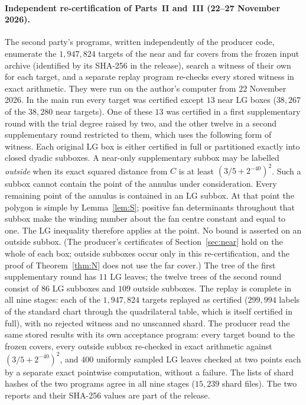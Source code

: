 \documentclass[11pt]{article}
\theoremstyle{remark}
\begin{document}
\paragraph{Independent re-certification of Parts~II and~III (22--27 November 2026).} The second party's programs,
written independently of the producer code, enumerate the $1{,}947{,}824$ targets of the near and far covers from the
frozen input archive (identified by its SHA-256 in the release), search a witness of their own for each target, and a
separate replay program re-checks every stored witness in exact arithmetic. They were run on the author's computer from
22 November 2026. In the main run every target was certified except $13$ near LG boxes ($38{,}267$ of the $38{,}280$
near targets). One of these $13$ was certified in a first supplementary round with the trial degree raised by two, and
the other twelve in a second supplementary round restricted to them, which uses the following form of witness. Each
original LG box is either certified in full or partitioned exactly into closed dyadic subboxes. A near-only
supplementary subbox may be labelled \emph{outside} when its exact squared distance from $C$ is at least
$(3/5+2^{-40})^2$. Such a subbox cannot contain the point of the annulus under consideration. Every remaining point of
the annulus is contained in an LG subbox. At that point the polygon is simple by Lemma~\ref{lem:S}; positive fan
determinants throughout that subbox make the winding number about the fan centre constant and equal to one. The LG
inequality therefore applies at the point. No bound is asserted on an outside subbox. (The producer's certificates of
Section~\ref{sec:near} hold on the whole of each box; outside subboxes occur only in this re-certification, and the
proof of Theorem~\ref{thm:N} does not use the far cover.) The tree of the first supplementary round has $11$ LG leaves; the twelve trees of the second
round consist of $86$ LG subboxes and $109$ outside subboxes. The replay is complete in all nine stages: each of the
$1{,}947{,}824$ targets replayed as certified ($299{,}994$ labels of the standard chart through the quadrilateral table,
which is itself certified in full), with no rejected witness and no unscanned shard. The producer read the same stored
results with its own acceptance program: every target bound to the frozen covers, every outside subbox re-checked in
exact arithmetic against $(3/5+2^{-40})^2$, and $400$ uniformly sampled LG leaves checked at two points each by a
separate exact pointwise computation, without a failure. The lists of shard hashes of the two programs agree in all
nine stages ($15{,}239$ shard files). The two reports and their SHA-256 values are part of the release.
\end{document}
